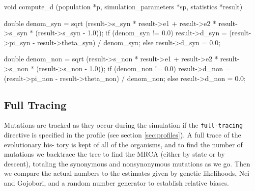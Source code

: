 \documentclass{article}
\begin{document}
\begin{ccode}
void compute_d (population *p, simulation_parameters *sp, statistics *result) {
  double denom_syn = sqrt (result->s_syn * result->e1 + result->e2 * result->s_syn *
							(result->s_syn - 1.0));
  if (denom_syn != 0.0)
    result->d_syn = (result->pi_syn - result->theta_syn) / denom_syn;
  else
    result->d_syn = 0.0;

  double denom_non = sqrt (result->s_non * result->e1 + result->e2 * result->s_non *
							(result->s_non - 1.0));
  if (denom_non != 0.0)
    result->d_non = (result->pi_non - result->theta_non) / denom_non;
  else
    result->d_non = 0.0;
}
\end{ccode}

    \subsection{Full Tracing}

      Mutations are tracked as they occur during the simulation if the
      \verb|full-tracing| directive is specified in the profile (see section
	  \ref{sec:profiles}). A full trace of the evolutionary his- tory is
      kept of all of the organisms, and to find the number of mutations we
      backtrace the tree to find the MRCA (either by state or by descent),
      totaling the synonymous and nonsynonymous mutations as we go. Then we
      compare the actual numbers to the estimates given by genetic likelihoods,
      Nei and Gojobori, and a random number generator to establish relative
      biases.
\end{document}
